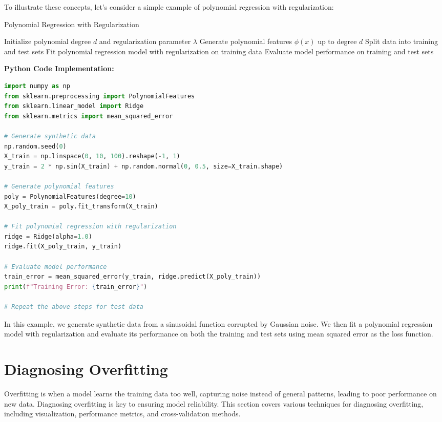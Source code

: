 \documentclass[12pt]{book} %
\begin{document}
To illustrate these concepts, let's consider a simple example of polynomial regression with regularization:
\FloatBarrier
\begin{algorithm}[H]
\caption{Polynomial Regression with Regularization}\label{alg:poly_regression}
\begin{algorithmic}[1]
\State Initialize polynomial degree \(d\) and regularization parameter \(\lambda\)
\State Generate polynomial features \(\phi(x)\) up to degree \(d\)
\State Split data into training and test sets
\State Fit polynomial regression model with regularization on training data
\State Evaluate model performance on training and test sets
\end{algorithmic}
\end{algorithm}
\FloatBarrier
\textbf{Python Code Implementation:}
\FloatBarrier
\begin{lstlisting}[language=Python, caption=Python implementation of polynomial regression with regularization]
import numpy as np
from sklearn.preprocessing import PolynomialFeatures
from sklearn.linear_model import Ridge
from sklearn.metrics import mean_squared_error

# Generate synthetic data
np.random.seed(0)
X_train = np.linspace(0, 10, 100).reshape(-1, 1)
y_train = 2 * np.sin(X_train) + np.random.normal(0, 0.5, size=X_train.shape)

# Generate polynomial features
poly = PolynomialFeatures(degree=10)
X_poly_train = poly.fit_transform(X_train)

# Fit polynomial regression with regularization
ridge = Ridge(alpha=1.0)
ridge.fit(X_poly_train, y_train)

# Evaluate model performance
train_error = mean_squared_error(y_train, ridge.predict(X_poly_train))
print(f"Training Error: {train_error}")

# Repeat the above steps for test data
\end{lstlisting}
\FloatBarrier
In this example, we generate synthetic data from a sinusoidal function corrupted by Gaussian noise. We then fit a polynomial regression model with regularization and evaluate its performance on both the training and test sets using mean squared error as the loss function.

\section{Diagnosing Overfitting}

Overfitting is when a model learns the training data too well, capturing noise instead of general patterns, leading to poor performance on new data. Diagnosing overfitting is key to ensuring model reliability. This section covers various techniques for diagnosing overfitting, including visualization, performance metrics, and cross-validation methods.
\end{document}
